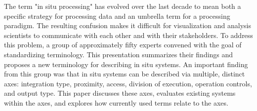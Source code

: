 
\license


The term "in situ processing" has evolved over the last decade to mean both a specific strategy for processing data and an umbrella term for a processing paradigm. The resulting confusion makes it difficult for visualization and analysis scientists to communicate with each other and with their stakeholders. To address this problem, a group of approximately fifty experts convened with the goal of standardizing terminology. This presentation summarizes their findings and proposes a new terminology for describing in situ systems. An important finding from this group was that in situ systems can be described via multiple, distinct axes: integration type, proximity, access, division of execution, operation controls, and output type. This paper discusses these axes, evaluates existing systems within
the axes, and explores how currently used terms relate to the axes.

